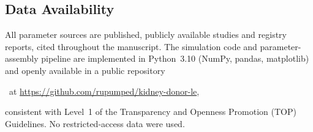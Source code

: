 \documentclass[11pt]{article}
\newif\ifanon
\begin{document}
\subsection*{Data Availability}
All parameter sources are published, publicly available studies and registry reports, cited throughout the manuscript. The simulation code and parameter-assembly pipeline are implemented in Python~3.10 (NumPy, pandas, matplotlib) and openly available in a public repository%
\ifanon
\ (link withheld during anonymized peer review; it will be provided on acceptance),
\else
\ at \url{https://github.com/rupumped/kidney-donor-le},
\fi
consistent with Level~1 of the Transparency and Openness Promotion (TOP) Guidelines. No restricted-access data were used.
\end{document}
